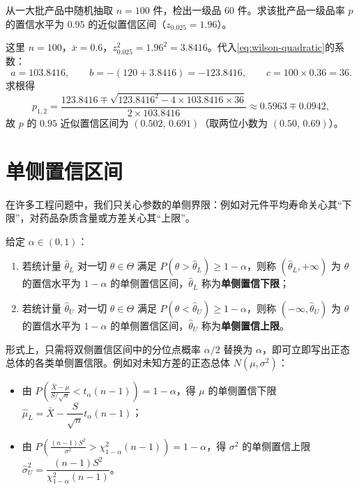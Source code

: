 \begin{example}[title={产品一级品率的近似置信区间}]
\label{eg:bernoulli-ci-example}
从一大批产品中随机抽取 $n=100$ 件，检出一级品 $60$ 件。求该批产品一级品率 $p$ 的置信水平为 $0.95$ 的近似置信区间（$z_{0.025}=1.96$）。
\begin{solution}
这里 $n=100$，$\bar{x}=0.6$，$z_{0.025}^2=1.96^2=3.8416$。代入\eqref{eq:wilson-quadratic}的系数：
\[
  a=103.8416,\qquad b=-(120+3.8416)=-123.8416,\qquad c=100\times 0.36=36.
\]
求根得
\[
  p_{1,2}=\frac{123.8416\mp\sqrt{123.8416^2-4\times 103.8416\times 36}}{2\times 103.8416}
  \approx 0.5963\mp 0.0942,
\]
故 $p$ 的 $0.95$ 近似置信区间为 $(0.502,\,0.691)$（取两位小数为 $(0.50,\,0.69)$）。
\end{solution}
\end{example}

\section{单侧置信区间}
\label{sec:one-sided-ci}

在许多工程问题中，我们只关心参数的单侧界限：例如对元件平均寿命关心其“下限”，对药品杂质含量或方差关心其“上限”。

\begin{definition}[单侧置信区间与单侧置信限]
\label{def:one-sided-ci}
给定 $\alpha\in(0,1)$：
\begin{enumerate}
  \item 若统计量 $\hat{\theta}_L$ 对一切 $\theta\in\Theta$ 满足 $P(\theta>\hat{\theta}_L)\ge 1-\alpha$，则称 $(\hat{\theta}_L,+\infty)$ 为 $\theta$ 的置信水平为 $1-\alpha$ 的单侧置信区间，$\hat{\theta}_L$ 称为\textbf{单侧置信下限}；
  \item 若统计量 $\hat{\theta}_U$ 对一切 $\theta\in\Theta$ 满足 $P(\theta<\hat{\theta}_U)\ge 1-\alpha$，则称 $(-\infty,\hat{\theta}_U)$ 为 $\theta$ 的置信水平为 $1-\alpha$ 的单侧置信区间，$\hat{\theta}_U$ 称为\textbf{单侧置信上限}。
\end{enumerate}
\end{definition}

形式上，只需将双侧置信区间中的分位点概率 $\alpha/2$ 替换为 $\alpha$，即可立即写出正态总体的各类单侧置信限。例如对未知方差的正态总体 $N(\mu,\sigma^2)$：
\begin{itemize}
  \item 由 $P\!\left(\frac{\bar{X}-\mu}{S/\sqrt{n}}<t_\alpha(n-1)\right)=1-\alpha$，得 $\mu$ 的单侧置信下限 $\hat{\mu}_L=\bar{X}-\dfrac{S}{\sqrt{n}}t_\alpha(n-1)$；
  \item 由 $P\!\left(\frac{(n-1)S^2}{\sigma^2}>\chi_{1-\alpha}^2(n-1)\right)=1-\alpha$，得 $\sigma^2$ 的单侧置信上限 $\hat{\sigma}_U^2=\dfrac{(n-1)S^2}{\chi_{1-\alpha}^2(n-1)}$。
\end{itemize}

